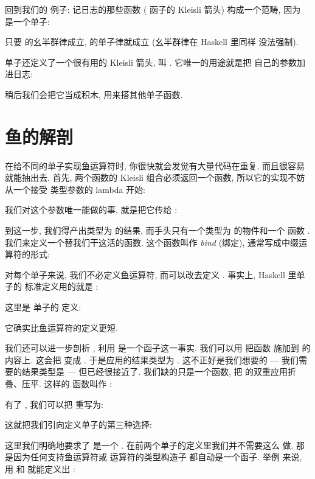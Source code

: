 回到我们的  例子: 记日志的那些函数 ( 函子的 Kleisli 箭头)
构成一个范畴, 因为  是一个单子:

只要  的幺半群律成立,  的单子律就成立 (幺半群律在 Haskell 里同样
没法强制).

 单子还定义了一个很有用的 Kleisli 箭头, 叫 . 它唯一的用途就是把
自己的参数加进日志:

稍后我们会把它当成积木, 用来搭其他单子函数.

\section{鱼的解剖}

在给不同的单子实现鱼运算符时, 你很快就会发觉有大量代码在重复, 而且很容易就能抽出去. 首先,
两个函数的 Kleisli 组合必须返回一个函数, 所以它的实现不妨从一个接受  类型参数的 lambda
开始:

我们对这个参数唯一能做的事, 就是把它传给 :

到这一步, 我们得产出类型为  的结果, 而手头只有一个类型为  的物件和一个
函数 . 我们来定义一个替我们干这活的函数. 这个函数叫作 \emph{bind} (绑定),
通常写成中缀运算符的形式:

对每个单子来说, 我们不必定义鱼运算符, 而可以改去定义 . 事实上, Haskell 里单子的
标准定义用的就是 :

这里是  单子的  定义:

它确实比鱼运算符的定义更短.

我们还可以进一步剖析 , 利用  是一个函子这一事实. 我们可以用
 把函数  施加到  的内容上. 这会把  变成
. 于是应用的结果类型为 . 这不正好是我们想要的 --- 我们需要的结果类型是
 --- 但已经很接近了. 我们缺的只是一个函数, 把  的双重应用折叠、压平. 这样的
函数叫作 :

有了 , 我们可以把  重写为:

这就把我们引向定义单子的第三种选择:

这里我们明确地要求了  是一个 . 在前两个单子的定义里我们并不需要这么
做. 那是因为任何支持鱼运算符或  运算符的类型构造子  都自动是一个函子. 举例
来说, 用  和  就能定义出 :

